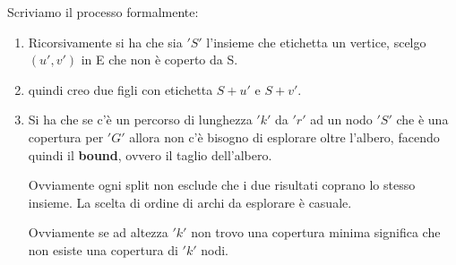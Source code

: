 										Scriviamo il processo formalmente:
										\begin{enumerate}
											\item Ricorsivamente si ha che sia $ 'S' $ l'insieme che etichetta un vertice, scelgo
											      $(u',v')$ in E che non è coperto da S.
											\item quindi creo due figli con etichetta $S +
											      {u'}$ e $S + {v'}$. 
											\item Si ha che se c'è un percorso di lunghezza $ 'k' $ da $ 'r' $ ad un
											      nodo $ 'S' $ che è una copertura per $ 'G' $ allora non c’è bisogno di esplorare oltre
											      l’albero, facendo quindi il \textbf{bound}, ovvero il taglio dell'albero. 
											      \begin{nota}
											      	Ovviamente ogni split non esclude che i due risultati coprano lo stesso
											      	insieme. La scelta di ordine di archi da esplorare è casuale.
											      \end{nota}
											      \begin{nota}
											      	Ovviamente se ad altezza $ 'k' $ non trovo una copertura minima significa che non
											      	esiste una copertura di $ 'k' $ nodi.
											      \end{nota}
										\end{enumerate}
